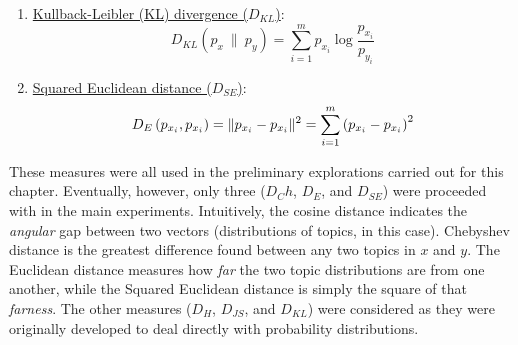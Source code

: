 \begin{enumerate}
  \item \underline{Kullback-Leibler (KL) divergence ($D_{KL}$)}:
    \begin{equation}
    D_{KL}\left( p_x \: \big\| \: p_y \right) = \sum_{i=1}^{m} p_{x_i} \log{\frac{p_{x_i}}{p_{y_i}}}
    \end{equation}

  \item \underline{Squared Euclidean distance ($D_{SE}$)}:
    \begin{equation}
      D_E\left( p_{x_i}, p_{x_i} \right) = \lVert p_{x_i} - p_{x_i}\rVert^2 = \sum _{i=1}^{m} \left( p_{x_i} - p_{x_i} \right)^2
    \end{equation}
\end{enumerate}

These measures were all used in the preliminary explorations carried out for this chapter. Eventually, however, only three ($D_Ch$, $D_{E}$, and $D_{SE}$) were proceeded with in the main experiments. Intuitively, the cosine distance indicates the \emph{angular} gap between two vectors (distributions of topics, in this case). Chebyshev distance is the greatest difference found between any two topics in $x$ and $y$. The Euclidean distance measures how \emph{far} the two topic distributions are from one another, while the Squared Euclidean distance is simply the square of that \emph{farness}. The other measures ($D_H$, $D_{JS}$, and $D_{KL}$) were considered as they were originally developed to deal directly with probability distributions.

